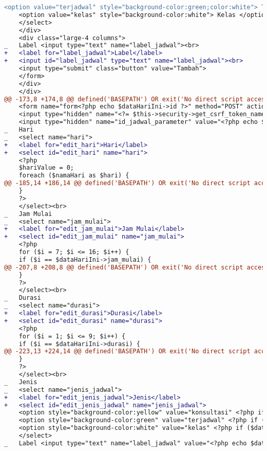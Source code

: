 \begin{lstlisting}[frame=single, label={lst:perbaikan_3.3.2_label_masukan}, language=diff, caption=Perbaikan Kriteria Sukses 3.3.2]
    <option value="terjadwal" style="background-color:green;color:white"> Terjadwal</option>
    <option value="kelas" style="background-color:white"> Kelas </option>
    </select>
    </div>
    <div class="large-4 columns">
_   Label <input type="text" name="label_jadwal"><br>
+   <label for="label_jadwal">Label</label>
+   <input id="label_jadwal" type="text" name="label_jadwal"><br>
    <input type="submit" class="button" value="Tambah">
    </form>
    </div>
    </div>
@@ -173,8 +174,8 @@ defined('BASEPATH') OR exit('No direct script access allowed');
    <form name="form<?php echo $dataHariIni->id ?>" method="POST" action="/EntriJadwalDosen/update/<?php echo $dataHariIni->id ?>">
    <input type="hidden" name="<?= $this->security->get_csrf_token_name() ?>" value="<?= $this->security->get_csrf_hash() ?>" />
    <input type="hidden" name="id_jadwal_parameter" value="<?php echo $dataHariIni->id ?>"> </a> <br>
_   Hari 
_   <select name="hari"> 
+   <label for="edit_hari">Hari</label>
+   <select id="edit_hari" name="hari"> 
    <?php
    $hariValue = 0;
    foreach ($namaHari as $hari) {
@@ -185,14 +186,14 @@ defined('BASEPATH') OR exit('No direct script access allowed');
    }
    ?>
    </select><br>
_   Jam Mulai
_   <select name="jam_mulai"> 
+   <label for="edit_jam_mulai">Jam Mulai</label>
+   <select id="edit_jam_mulai" name="jam_mulai"> 
    <?php
    for ($i = 7; $i <= 16; $i++) {
    if ($i == $dataHariIni->jam_mulai) {
@@ -207,8 +208,8 @@ defined('BASEPATH') OR exit('No direct script access allowed');
    }
    ?>
    </select><br>
_   Durasi
_   <select name="durasi"> 
+   <label for="edit_durasi">Durasi</label>
+   <select id="edit_durasi" name="durasi"> 
    <?php
    for ($i = 1; $i <= 9; $i++) {
    if ($i == $dataHariIni->durasi) {
@@ -223,13 +224,14 @@ defined('BASEPATH') OR exit('No direct script access allowed');
    }
    ?>
    </select><br>
_   Jenis  
_   <select name="jenis_jadwal"> 
+   <label for="edit_jenis_jadwal">Jenis</label>
+   <select id="edit_jenis_jadwal" name="jenis_jadwal"> 
    <option style="background-color:yellow" value="konsultasi" <?php if ($dataHariIni->jenis == 'konsultasi') echo "selected"; ?> > Konsultasi </option>
    <option style="background-color:green" value="terjadwal" <?php if ($dataHariIni->jenis == 'terjadwal') echo "selected"; ?>> Terjadwal</option>
    <option style="background-color:white" value="kelas" <?php if ($dataHariIni->jenis == 'kelas') echo "selected"; ?>> Kelas </option>
    </select>
_   Label <input type="text" name="label_jadwal" value="<?php echo $dataHariIni->label; ?>"><br> 

\end{lstlisting}
